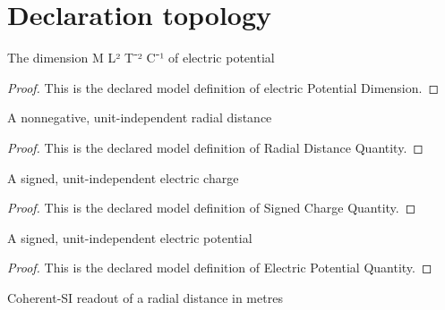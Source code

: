 \section{Declaration topology}
\begin{definition}
  \label{def:physics:phyx-mini-0857:phyxminiproblems-problemphyxmini0857-electricpotentialdimension}
  The dimension M L² T⁻² C⁻¹ of electric potential
\end{definition}
\begin{proof}
  This is the declared model definition of electric Potential Dimension.
\end{proof}
\begin{definition}
  \label{def:physics:phyx-mini-0857:phyxminiproblems-problemphyxmini0857-radialdistancequantity}
  A nonnegative, unit-independent radial distance
\end{definition}
\begin{proof}
  This is the declared model definition of Radial Distance Quantity.
\end{proof}
\begin{definition}
  \label{def:physics:phyx-mini-0857:phyxminiproblems-problemphyxmini0857-signedchargequantity}
  A signed, unit-independent electric charge
\end{definition}
\begin{proof}
  This is the declared model definition of Signed Charge Quantity.
\end{proof}
\begin{definition}
  \label{def:physics:phyx-mini-0857:phyxminiproblems-problemphyxmini0857-electricpotentialquantity}
  A signed, unit-independent electric potential
\end{definition}
\begin{proof}
  This is the declared model definition of Electric Potential Quantity.
\end{proof}
\begin{definition}
  \label{def:physics:phyx-mini-0857:phyxminiproblems-problemphyxmini0857-radialdistanceinmeters}
  Coherent-SI readout of a radial distance in metres
\end{definition}
